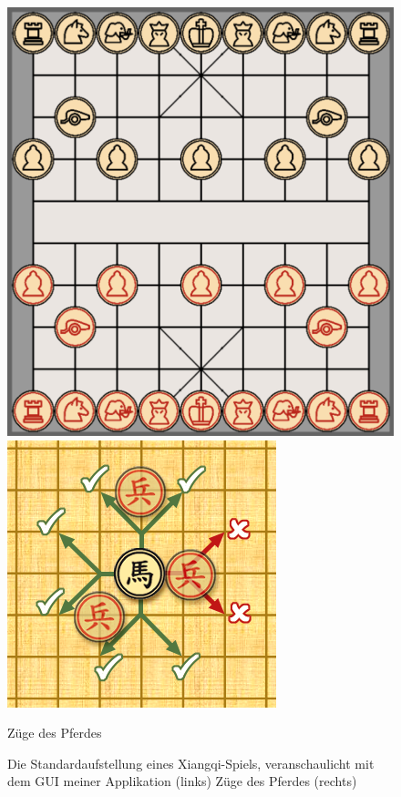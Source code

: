 \documentclass[
  manuscript=article,  %
  layout=publish,  %
  year=2023,
  volume=1,
]{extra/joas}
\begin{document}
\begin{figure}
  \centering
  \begin{minipage}{0.49\textwidth}
    \includegraphics[width=\textwidth]{imgs/board.png}
  \end{minipage}
  \hfill
  \begin{minipage}{0.49\textwidth}
    \includegraphics[width=\textwidth]{imgs/MovementOfHorsePiece.png}
    \caption{Züge des Pferdes}
  \end{minipage}
  \captionsetup{justification=centering}
  \caption{Die Standardaufstellung eines Xiangqi-Spiels, veranschaulicht mit dem GUI meiner Applikation (links)
  Züge des Pferdes (rechts)}
  \label{fig:horseandBoard}
\end{figure}
\end{document}
